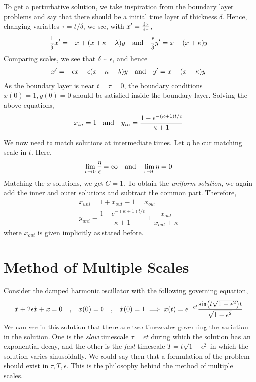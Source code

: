\documentclass[a4paper,11pt]{article}
\begin{document}
To get a perturbative solution, we take inspiration from the boundary layer problems and say that there should be a initial time layer of thickness $ \delta $. Hence, changing variables $ \tau = t/\delta $, we see, with $ x' = \dv{x}{\tau} $,
\begin{equation*}
\dfrac{1}{\delta} x' = -x + (x + \kappa - \lambda )y \qq{and} \dfrac{\epsilon}{\delta} y' = x - (x + \kappa) y  
\end{equation*}
Comparing scales, we see that $ \delta \sim \epsilon $, and hence
\begin{align*}
 x' = -\epsilon x + \epsilon (x + \kappa - \lambda )y \qq{and} y' = x - (x + \kappa) y  
\end{align*}
As the boundary layer is near $ t = \tau = 0 $, the boundary conditions $ x(0)=1, y(0)=0  $ should be satisfied inside the boundary layer. Solving the above equations,
\begin{equation*}
x_{in } =1 \qq{and} y_{in} = \dfrac{1 - e^{- (\kappa + 1) t/\epsilon}}{\kappa + 1}
\end{equation*}

We now need to match solutions at intermediate times. Let $ \eta  $ be our matching scale in $ t $. Here,
\begin{equation*}
\lim\limits_{\epsilon \rightarrow 0} \dfrac{\eta}{\epsilon} = \infty \qq{and} \lim\limits_{\epsilon \rightarrow 0} \eta = 0
\end{equation*}
Matching the $ x$ solutions, we get $ C=1 $. To obtain the \textit{uniform solution}, we again add the inner and outer solutions and subtract the common part. Therefore,
\begin{align*}
x_{uni} = 1 + x_{out} -1 = x_{out} \\
y_{uni} = \dfrac{1 - e^{- (\kappa + 1) t/\epsilon}}{\kappa + 1} + \dfrac{x_{out}}{x_{out} + \kappa}
\end{align*}
where $ x_{out} $ is given implicitly as stated before.








\section{Method of Multiple Scales}
Consider the damped harmonic oscillator with the following governing equation,
\begin{equation*}
\ddot{x} + 2 \epsilon \dot{x} + x = 0 \qq{,}  x(0) = 0 \qq{,} \dot{x}(0) = 1 \implies x(t) = e^{-\epsilon t} \dfrac{\sin(t \sqrt{1-\epsilon^2})t}{\sqrt{1-\epsilon^2}}
\end{equation*}
We can see in this solution that there are two timescales governing the variation in the solution. One is the \textit{slow} timescale $ \tau = \epsilon t $ during which the solution has an exponential decay, and the other is the \textit{fast} timescale $ T = t \sqrt{1 - \epsilon^2} $ in which the solution varies sinusoidally. We could say then that a formulation of the problem should exist in $ \tau, T, \epsilon $. This is the philosophy behind the method of multiple scales.
\end{document}
